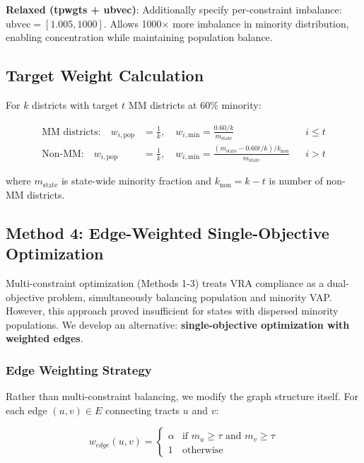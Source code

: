 \textbf{Relaxed (tpwgts + ubvec)}: Additionally specify per-constraint imbalance: $\text{ubvec} = [1.005, 1000]$. Allows 1000$\times$ more imbalance in minority distribution, enabling concentration while maintaining population balance.

\subsection{Target Weight Calculation}

For $k$ districts with target $t$ MM districts at 60\% minority:

\begin{align}
\text{MM districts:} \quad w_{i,\text{pop}} &= \frac{1}{k}, \quad w_{i,\text{min}} = \frac{0.60/k}{m_{\text{state}}} && i \leq t\\
\text{Non-MM:} \quad w_{i,\text{pop}} &= \frac{1}{k}, \quad w_{i,\text{min}} = \frac{(m_{\text{state}} - 0.60t/k)/k_{\text{non}}}{m_{\text{state}}} && i > t
\end{align}

where $m_{\text{state}}$ is state-wide minority fraction and $k_{\text{non}} = k - t$ is number of non-MM districts.

\subsection{Method 4: Edge-Weighted Single-Objective Optimization}

Multi-constraint optimization (Methods 1-3) treats VRA compliance as a dual-objective problem, simultaneously balancing population and minority VAP. However, this approach proved insufficient for states with dispersed minority populations. We develop an alternative: \textbf{single-objective optimization with weighted edges}.

\subsubsection{Edge Weighting Strategy}

Rather than multi-constraint balancing, we modify the graph structure itself. For each edge $(u, v) \in E$ connecting tracts $u$ and $v$:

\begin{equation}
w_{edge}(u, v) = \begin{cases}
\alpha & \text{if } m_u \geq \tau \text{ and } m_v \geq \tau \\
1 & \text{otherwise}
\end{cases}
\end{equation}

